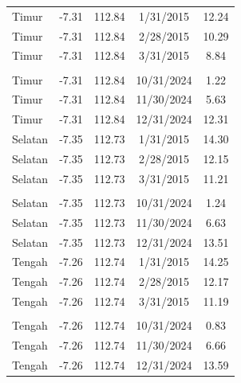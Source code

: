 \begin{longtable}{|l|c|c|c|c|}
    Timur  & -7.31 & 112.84 & 1/31/2015 & 12.24 \\
    Timur  & -7.31 & 112.84 & 2/28/2015 & 10.29 \\
    Timur  & -7.31 & 112.84 & 3/31/2015 & 8.84 \\
    \multicolumn{1}{|c|}{\raisebox{0.5ex}{$\vdots$}} &
    \multicolumn{1}{c|}{\raisebox{0.5ex}{$\vdots$}} &
    \multicolumn{1}{c|}{\raisebox{0.5ex}{$\vdots$}} &
    \multicolumn{1}{c|}{\raisebox{0.5ex}{$\vdots$}} &
    \multicolumn{1}{c|}{\raisebox{0.5ex}{$\vdots$}} \\  
    Timur  & -7.31 & 112.84 & 10/31/2024 & 1.22 \\
    Timur  & -7.31 & 112.84 & 11/30/2024 & 5.63 \\
    Timur  & -7.31 & 112.84 & 12/31/2024 & 12.31 \\
    \hline

    Selatan & -7.35 & 112.73 & 1/31/2015 & 14.30 \\
    Selatan & -7.35 & 112.73 & 2/28/2015 & 12.15 \\
    Selatan & -7.35 & 112.73 & 3/31/2015 & 11.21 \\
    \multicolumn{1}{|c|}{\raisebox{0.5ex}{$\vdots$}} &
    \multicolumn{1}{c|}{\raisebox{0.5ex}{$\vdots$}} &
    \multicolumn{1}{c|}{\raisebox{0.5ex}{$\vdots$}} &
    \multicolumn{1}{c|}{\raisebox{0.5ex}{$\vdots$}} &
    \multicolumn{1}{c|}{\raisebox{0.5ex}{$\vdots$}} \\  
    Selatan & -7.35 & 112.73 & 10/31/2024 & 1.24 \\
    Selatan & -7.35 & 112.73 & 11/30/2024 & 6.63 \\
    Selatan & -7.35 & 112.73 & 12/31/2024 & 13.51 \\
    \hline

    Tengah & -7.26 & 112.74 & 1/31/2015 & 14.25 \\
    Tengah & -7.26 & 112.74 & 2/28/2015 & 12.17 \\
    Tengah & -7.26 & 112.74 & 3/31/2015 & 11.19 \\
    \multicolumn{1}{|c|}{\raisebox{0.5ex}{$\vdots$}} &
    \multicolumn{1}{c|}{\raisebox{0.5ex}{$\vdots$}} &
    \multicolumn{1}{c|}{\raisebox{0.5ex}{$\vdots$}} &
    \multicolumn{1}{c|}{\raisebox{0.5ex}{$\vdots$}} &
    \multicolumn{1}{c|}{\raisebox{0.5ex}{$\vdots$}} \\  
    Tengah & -7.26 & 112.74 & 10/31/2024 & 0.83 \\
    Tengah & -7.26 & 112.74 & 11/30/2024 & 6.66 \\
    Tengah & -7.26 & 112.74 & 12/31/2024 & 13.59 \\
    \hline

\end{longtable}